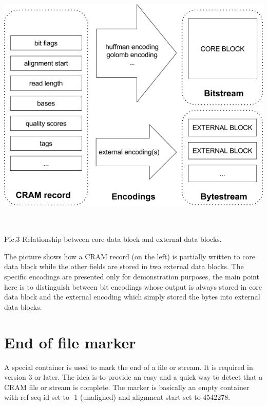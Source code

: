 \documentclass[a4paper]{article}
\begin{document}
\includegraphics[width=451pt, height=350pt, keepaspectratio=true]{img/CRAMFileFormat2-1-fig007.png}

Pic.3 Relationship between core data block and external data blocks.

The picture shows how a CRAM record (on the left) is partially written to core 
data block while the other fields are stored in two external data blocks. The specific 
encodings are presented only for demonstration purposes, the main point here is 
to distinguish between bit encodings whose output is always stored in core data 
block and the external encoding which simply stored the bytes into external data 
blocks.

\section{\textbf{End of file marker}}

A special container is used to mark the end of a file or stream. It is required in version 3 or later. The idea is to provide an easy and a quick way to detect that a CRAM file or stream is complete. The marker is basically an empty container with ref seq id set to -1 (unaligned) and alignment 
start set to 4542278.
\end{document}
